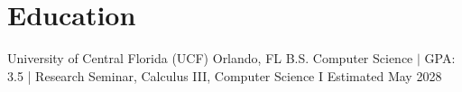 \section{Education}
\resumeSubHeadingListStart
\resumeSubheading
    {University of Central Florida (UCF)}
    {Orlando, FL}
    {B.S. Computer Science $|$ GPA: 3.5 | Research Seminar, Calculus III, Computer Science I}
    {Estimated May 2028}
\resumeSubHeadingListEnd